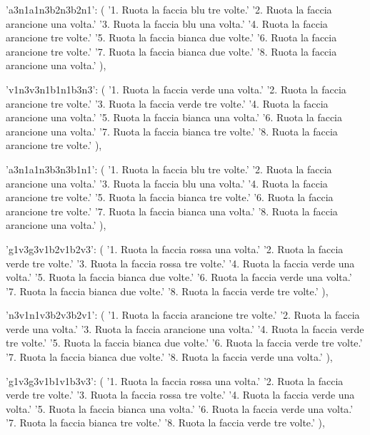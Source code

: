 {{        'a3n1a1n3b2n3b2n1': (
            '1. Ruota la faccia blu tre volte.\n'
            '2. Ruota la faccia arancione una volta.\n'
            '3. Ruota la faccia blu una volta.\n'
            '4. Ruota la faccia arancione tre volte.\n'
            '5. Ruota la faccia bianca due volte.\n'
            '6. Ruota la faccia arancione tre volte.\n'
            '7. Ruota la faccia bianca due volte.\n'
            '8. Ruota la faccia arancione una volta.'
        ),

        'v1n3v3n1b1n1b3n3': (
            '1. Ruota la faccia verde una volta.\n'
            '2. Ruota la faccia arancione tre volte.\n'
            '3. Ruota la faccia verde tre volte.\n'
            '4. Ruota la faccia arancione una volta.\n'
            '5. Ruota la faccia bianca una volta.\n'
            '6. Ruota la faccia arancione una volta.\n'
            '7. Ruota la faccia bianca tre volte.\n'
            '8. Ruota la faccia arancione tre volte.'
        ),

        'a3n1a1n3b3n3b1n1': (
            '1. Ruota la faccia blu tre volte.\n'
            '2. Ruota la faccia arancione una volta.\n'
            '3. Ruota la faccia blu una volta.\n'
            '4. Ruota la faccia arancione tre volte.\n'
            '5. Ruota la faccia bianca tre volte.\n'
            '6. Ruota la faccia arancione tre volte.\n'
            '7. Ruota la faccia bianca una volta.\n'
            '8. Ruota la faccia arancione una volta.'
        ),

        'g1v3g3v1b2v1b2v3': (
            '1. Ruota la faccia rossa una volta.\n'
            '2. Ruota la faccia verde tre volte.\n'
            '3. Ruota la faccia rossa tre volte.\n'
            '4. Ruota la faccia verde una volta.\n'
            '5. Ruota la faccia bianca due volte.\n'
            '6. Ruota la faccia verde una volta.\n'
            '7. Ruota la faccia bianca due volte.\n'
            '8. Ruota la faccia verde tre volte.'
        ),

        'n3v1n1v3b2v3b2v1': (
            '1. Ruota la faccia arancione tre volte.\n'
            '2. Ruota la faccia verde una volta.\n'
            '3. Ruota la faccia arancione una volta.\n'
            '4. Ruota la faccia verde tre volte.\n'
            '5. Ruota la faccia bianca due volte.\n'
            '6. Ruota la faccia verde tre volte.\n'
            '7. Ruota la faccia bianca due volte.\n'
            '8. Ruota la faccia verde una volta.'
        ),

        'g1v3g3v1b1v1b3v3': (
            '1. Ruota la faccia rossa una volta.\n'
            '2. Ruota la faccia verde tre volte.\n'
            '3. Ruota la faccia rossa tre volte.\n'
            '4. Ruota la faccia verde una volta.\n'
            '5. Ruota la faccia bianca una volta.\n'
            '6. Ruota la faccia verde una volta.\n'
            '7. Ruota la faccia bianca tre volte.\n'
            '8. Ruota la faccia verde tre volte.'
        ),

}}
